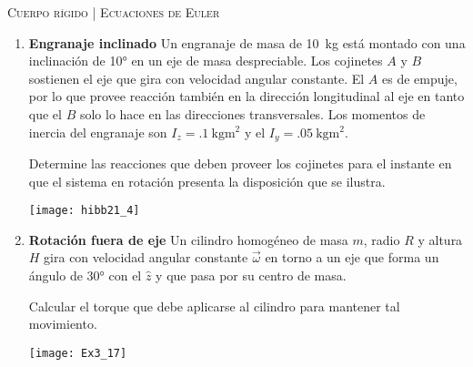 \documentclass[11pt, spanish, a4paper, twoside]{article}
\begin{document}
\begin{center}
  \textsc{\large Cuerpo rígido | Ecuaciones de Euler}
\end{center}


\begin{enumerate}

	\item 
	\begin{minipage}[t][5cm]{0.55\textwidth}
		\textbf{Engranaje inclinado}
		Un engranaje de masa de \SI{10}{\kilo\gram} está montado con una inclinación de \ang{10;;} en un eje de masa despreciable.
		Los cojinetes \(A\) y \(B\) sostienen el eje que gira con velocidad angular constante.
		El \(A\) es de empuje, por lo que provee reacción también en la dirección longitudinal al eje en tanto que el \(B\) solo lo hace en las direcciones transversales.
		Los momentos de inercia del engranaje son \(I_z = \SI{.1}{\kilo\gram\metre\squared}\) y el \(I_y = \SI{.05}{\kilo\gram\metre\squared}\).
		\begin{tasks} 
			\task Determine las reacciones que deben proveer los cojinetes para el instante en que el sistema en rotación presenta la disposición que se ilustra.
		\end{tasks}
	\end{minipage}
	\begin{minipage}[c][0.5cm][t]{0.4\textwidth}
		\texttt{[image: hibb21\_4]}
	\end{minipage}




	\item
	\begin{minipage}[t][3cm]{0.75\textwidth}
		\textbf{Rotación fuera de eje}
		Un cilindro homogéneo de masa \(m\), radio \(R\) y altura \(H\) gira con velocidad angular constante \(\vec{\omega}\) en torno a un eje que forma un ángulo de \ang{30;;} con el \(\hat{z}\) y que pasa por su centro de masa.
		\begin{tasks}
			\task Calcular el torque que debe aplicarse al cilindro para mantener tal movimiento.
		\end{tasks}
	\end{minipage}
	\begin{minipage}[c][2cm][t]{0.2\textwidth}
		\texttt{[image: Ex3\_17]}
	\end{minipage}



\end{enumerate}
\end{document}
